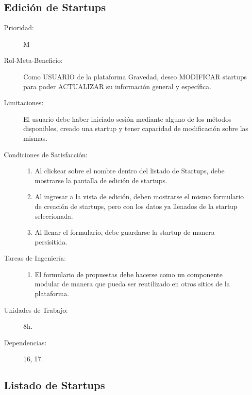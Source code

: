\newpage


\subsection{Edición de Startups}

\begin{description}
    \item[Prioridad:] M
    \item[Rol-Meta-Beneficio:] Como USUARIO de la plataforma Gravedad, deseo MODIFICAR startups para poder ACTUALIZAR su información general y específica.
    \item[Limitaciones:] El usuario debe haber iniciado sesión mediante alguno de los métodos disponibles, creado una startup y tener capacidad de modificación sobre las mismas.
    \item[Condiciones de Satisfacción:]  \hfill
        \begin{enumerate}
            \item Al clickear sobre el nombre dentro del listado de Startups, debe mostrarse la pantalla de edición de startups.
    		\item Al ingresar a la vista de edición, deben mostrarse el mismo formulario de creación de startups, pero con los datos ya llenados de la startup seleccionada.
    		\item Al llenar el formulario, debe guardarse la startup de manera persisitida.
        \end{enumerate}
    \item[Tareas de Ingeniería:]  \hfill
        \begin{enumerate}
            \item El formulario de propuestas debe hacerse como un componente modular de manera que pueda ser reutilizado en otros sitios de la plataforma.
        \end{enumerate}
    \item[Unidades de Trabajo:] 8h.
    \item[Dependencias:] 16, 17.
\end{description}

\newpage



\subsection{Listado de Startups}

